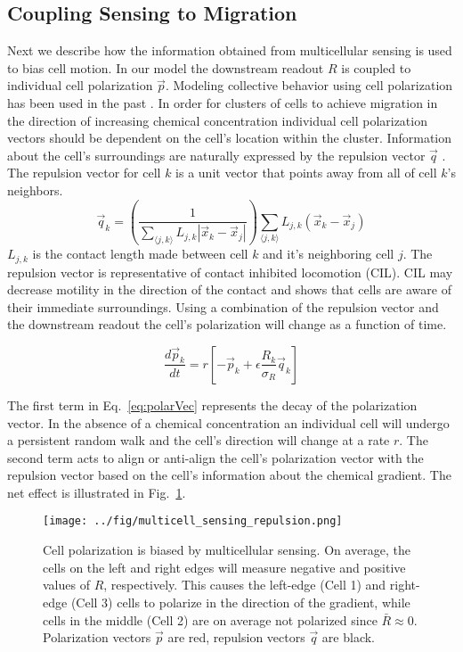 \documentclass[phys,prelim]{puthesis}
\begin{document}
\subsection{Coupling Sensing to Migration}

Next we describe how the information obtained from multicellular sensing is used to bias cell motion. In our model the downstream readout $R$ is coupled to individual cell polarization $\vec{p}$. Modeling collective behavior using cell polarization has been used in the past \cite{szabo2010collective,camley2015emergent}. In order for clusters of cells to achieve migration in the direction of increasing chemical concentration individual cell polarization vectors should be dependent on the cell's location within the cluster. Information about the cell's surroundings are naturally expressed by the repulsion vector $\vec{q}$ \cite{camley2015emergent}. The repulsion vector for cell $k$ is a unit vector that points away from all of cell $k$'s neighbors.
\begin{equation}
    \vec{q}_k = \left( \frac{1}{\sum_{\langle j,k \rangle} L_{j,k}|\vec{x}_k - \vec{x}_j|} \right)
    \sum_{\langle j,k \rangle} L_{j,k} \left( \vec{x}_k - \vec{x}_j \right)
\end{equation}
$L_{j,k}$ is the contact length made between cell $k$ and it's neighboring cell $j$. The repulsion vector is representative of contact inhibited locomotion (CIL). CIL may decrease motility in the direction of the contact and shows that cells are aware of their immediate surroundings. Using a combination of the repulsion vector and the downstream readout the cell's polarization will change as a function of time.

\begin{equation} \label{eq:polarVec}
    \frac{d\vec{p}_k}{dt} = r \left[ -\vec{p}_k + \epsilon \frac{R_k}{\sigma_R} \vec{q}_k \right]
\end{equation}

The first term  in Eq.\ \ref{eq:polarVec} represents the decay of the polarization vector. In the absence of a chemical concentration an individual cell will undergo a persistent random walk and the cell's direction will change at a rate $r$. The second term acts to align or anti-align the cell’s polarization vector with the repulsion vector based on the cell's information about the chemical gradient. The net effect is illustrated in Fig.\ \ref{fig:cellPolar}.

\begin{figure}[ht]
    \centering
        \texttt{[image: ../fig/multicell\_sensing\_repulsion.png]}
    \caption{Cell polarization is biased by multicellular sensing. On average, the cells on the left and right edges will measure negative and positive values of $R$, respectively. This causes the left-edge (Cell 1) and right-edge (Cell 3) cells to polarize in the direction of the gradient, while cells in the middle (Cell 2) are on average not polarized since $\bar{R} \approx 0$. Polarization vectors $\vec{p}$ are red, repulsion vectors $\vec{q}$ are black.} \label{fig:cellPolar}
\end{figure}
\end{document}
